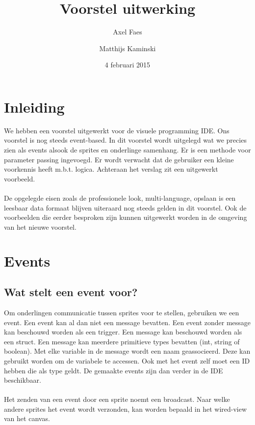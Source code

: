 \documentclass[]{article}
\begin{document}
\title{Voorstel uitwerking}
\author{Axel Faes \and Matthijs Kaminski}
\date{4 februari 2015}
\maketitle

\section{Inleiding}
We hebben een voorstel uitgewerkt voor de visuele programming IDE.  Ons voorstel is nog steeds event-based. In dit voorstel wordt uitgelegd wat we precies zien als events alsook de sprites en onderlinge samenhang. Er is een methode voor parameter passing ingevoegd. Er wordt verwacht dat de gebruiker een kleine voorkennis heeft m.b.t. logica. Achteraan het verslag zit een uitgewerkt voorbeeld.  \\\\ 
De opgelegde eisen zoals de professionele look, multi-language, opslaan is een leesbaar data formaat blijven uiteraard nog steeds gelden in dit voorstel. Ook de voorbeelden die eerder besproken zijn kunnen uitgewerkt worden in de omgeving van het nieuwe voorstel.
\section{Events}
\subsection{Wat stelt een event voor?}
Om onderlingen communicatie tussen sprites voor te stellen, gebruiken we een event. Een event kan al dan niet een message bevatten. Een event zonder message kan beschouwd worden als een trigger. Een message kan beschouwd worden als een struct. Een message kan meerdere primitieve types bevatten (int, string of boolean). Met elke variable in de message wordt een naam geassocieerd. Deze kan gebruikt worden om de variabele te accessen. Ook met het event zelf moet een ID hebben die als type geldt. De gemaakte events zijn dan verder in de IDE beschikbaar.\\\\
Het zenden van een event door een sprite noemt een broadcast. Naar welke andere sprites het event wordt verzonden, kan worden bepaald in het wired-view van het canvas.
\end{document}
